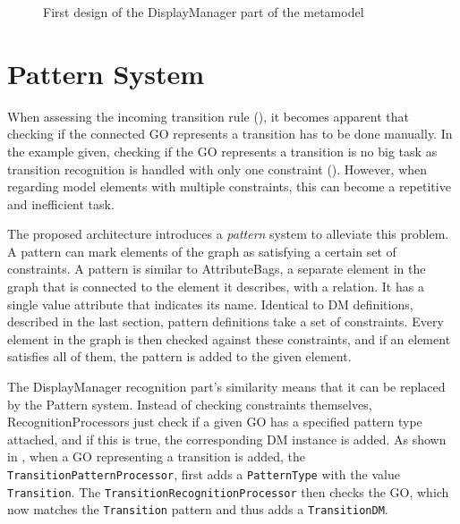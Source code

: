 \begin{figure}[h]
  \centering
  
  \caption{First design of the DisplayManager part of the metamodel}
  \label{fig:initial-syntax-model}
\end{figure}


\section{Pattern System}
When assessing the incoming transition rule (), it becomes apparent that checking if the connected GO represents a transition has to be done manually. In the example given, checking if the GO represents a transition is no big task as transition recognition is handled with only one constraint (). However, when regarding model elements with multiple constraints, this can become a repetitive and inefficient task.

The proposed architecture introduces a \emph{pattern} system to alleviate this problem. A pattern can mark elements of the graph as satisfying a certain set of constraints. A pattern is similar to AttributeBags, a separate element in the graph that is connected to the element it describes, with a relation. It has a single value attribute that indicates its name. Identical to DM definitions, described in the last section, pattern definitions take a set of constraints. Every element in the graph is then checked against these constraints, and if an element satisfies all of them, the pattern is added to the given element. 

%   

The DisplayManager recognition part's similarity means that it can be replaced by the Pattern system. Instead of checking constraints themselves, RecognitionProcessors just check if a given GO has a specified pattern type attached, and if this is true, the corresponding DM instance is added. As shown in , when a GO representing a transition is added, the \texttt{TransitionPatternProcessor}, first adds a \texttt{PatternType} with the value \texttt{Transition}. The \texttt{TransitionRecognitionProcessor} then checks the GO, which now matches the \texttt{Transition} pattern and thus adds a \texttt{TransitionDM}.



